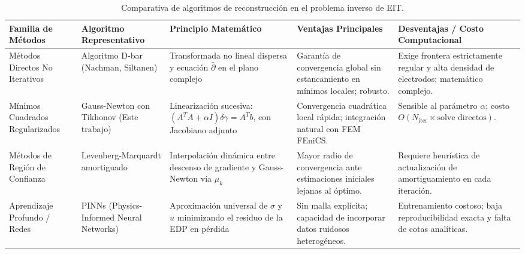 \begin{table}[htbp]
  \centering
  \caption{Comparativa de algoritmos de reconstrucción en el problema inverso de EIT.}
  \label{tab:inverse_algorithms}
  \begin{tabular}{p{3.0cm} p{3.2cm} p{4.2cm} p{3.2cm} p{3.2cm}}
    \hline\hline
    \textbf{Familia de Métodos} & \textbf{Algoritmo Representativo} & \textbf{Principio Matemático} & \textbf{Ventajas Principales} & \textbf{Desventajas / Costo Computacional} \\ \hline
    Métodos Directos No Iterativos & Algoritmo D-bar (Nachman, Siltanen) & Transformada no lineal dispersa y ecuación $\bar{\partial}$ en el plano complejo & Garantía de convergencia global sin estancamiento en mínimos locales; robusto. & Exige frontera estrictamente regular y alta densidad de electrodos; matemático complejo. \\ \hline
    Mínimos Cuadrados Regularizados & Gauss-Newton con Tikhonov (Este trabajo) & Linearización sucesiva: $(A^T A + \alpha I) \delta\gamma = A^T b$, con Jacobiano adjunto & Convergencia cuadrática local rápida; integración natural con FEM FEniCS. & Sensible al parámetro $\alpha$; costo $O(N_{\text{iter}} \times \text{solve directos})$. \\ \hline
    Métodos de Región de Confianza & Levenberg-Marquardt amortiguado & Interpolación dinámica entre descenso de gradiente y Gauss-Newton vía $\mu_k$ & Mayor radio de convergencia ante estimaciones iniciales lejanas al óptimo. & Requiere heurística de actualización de amortiguamiento en cada iteración. \\ \hline
    Aprendizaje Profundo / Redes & PINNs (Physics-Informed Neural Networks) & Aproximación universal de $\sigma$ y $u$ minimizando el residuo de la EDP en pérdida & Sin malla explícita; capacidad de incorporar datos ruidosos heterogéneos. & Entrenamiento costoso; baja reproducibilidad exacta y falta de cotas analíticas. \\ \hline
    \hline\hline
  \end{tabular}
\end{table}
